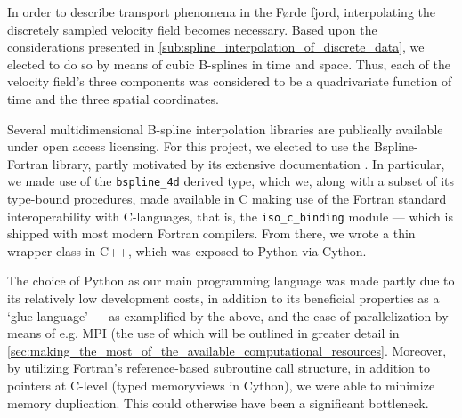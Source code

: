 In order to describe transport phenomena in the Førde fjord, interpolating
the discretely sampled velocity field becomes necessary. Based upon the
considerations presented in \cref{sub:spline_interpolation_of_discrete_data},
we elected to do so by means of cubic B-splines in time and space. Thus,
each of the velocity field's three components was considered to be a
quadrivariate function of time and the three spatial coordinates.

Several multidimensional B-spline interpolation libraries are publically
available under open access licensing. For this project, we elected to use
the Bspline-Fortran library, partly motivated by its extensive documentation
\parencite{williams2018bspline}. In particular, we made use of the
\texttt{bspline\_4d} derived type, which we, along with a subset of its
type-bound procedures, made available in C making use of the Fortran standard
interoperability with C-languages, that is, the \texttt{iso\_c\_binding} module
--- which is shipped with most modern Fortran compilers. From there, we wrote a
thin wrapper class in C++, which was exposed to Python via Cython.

The choice of Python as our main programming language was made partly due to
its relatively low development costs, in addition to its beneficial properties
as a `glue language' --- as examplified by the above, and the ease of
parallelization by means of e.g. MPI (the use of which will be outlined in
greater detail in
\cref{sec:making_the_most_of_the_available_computational_resources}.
Moreover, by utilizing Fortran's reference-based subroutine call structure, in
addition to pointers at C-level (typed memoryviews in Cython), we were able to
minimize memory duplication. This could otherwise have been a significant
bottleneck.

